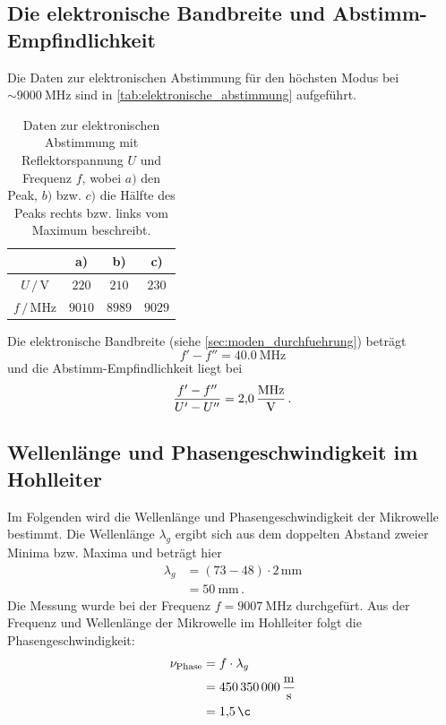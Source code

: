 \subsection{Die elektronische Bandbreite und Abstimm-Empfindlichkeit}
Die Daten zur elektronischen Abstimmung für den höchsten Modus bei $\sim \SI{9000}{\mega\hertz}$ sind in \autoref{tab:elektronische_abstimmung} aufgeführt.
\begin{table}
    \centering
    \caption{Daten zur elektronischen Abstimmung mit Reflektorspannung $U$ und Frequenz $f$, wobei $a)$ den Peak, $b)$ bzw. $c)$ die Hälfte des Peaks rechts bzw. links vom Maximum beschreibt.}
    \begin{tabular}{c c c c}
        \toprule
        & a) & b) & c) \\
        \midrule
        $U \,/\, \si{\volt}$ & $220$ & $210$ & $230$ \\
        $f \,/\, \si{\mega\hertz}$ & $9010$ & $8989$ & $9029$ \\
    \end{tabular}
    \label{tab:elektronische_abstimmung}
\end{table}
Die elektronische Bandbreite (siehe \autoref{sec:moden_durchfuehrung}) beträgt
\begin{equation*}
    f' - f'' = \SI{40.0}{\mega\hertz}
\end{equation*}
und die Abstimm-Empfindlichkeit liegt bei
\begin{equation*}
    \frac{f' - f''}{U' - U''} = \SI{2.0}{\frac{\mega\hertz}{\volt}} \, .
\end{equation*}
\FloatBarrier

\subsection{Wellenlänge und Phasengeschwindigkeit im Hohlleiter}
\label{sec:ausw_frequenz}
Im Folgenden wird die Wellenlänge und Phasengeschwindigkeit der Mikrowelle bestimmt.
Die Wellenlänge $\lambda_g$ ergibt sich aus dem doppelten Abstand zweier Minima bzw. Maxima und beträgt hier
\begin{align*}
    \lambda_g &= (73 - 48) \cdot 2 \, \si{\milli \metre} \\
    &= \SI{50}{\milli \metre} \, .
\end{align*}
Die Messung wurde bei der Frequenz $f = \SI{9007}{\mega\hertz}$ durchgefürt.
Aus der Frequenz und Wellenlänge der Mikrowelle im Hohlleiter folgt die Phasengeschwindigkeit:
\begin{align*}
    \nu_\text{Phase} &= f \cdot \lambda_g \\
    &= \SI{450350000}{\frac{\metre}{\second}} \\
    &= \SI{1.5}{\c} \\
\end{align*}
\FloatBarrier

